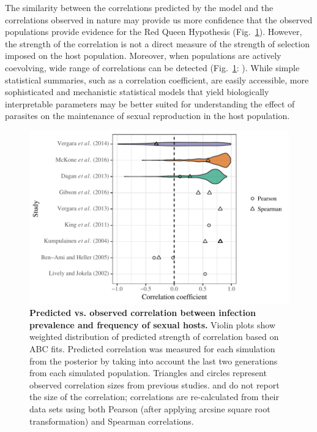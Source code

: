 \documentclass{article}\usepackage[]{graphicx}\usepackage[]{color}
\newcommand{\fref}[1]{Fig.~\ref{fig:#1}}
\begin{document}
The similarity between the correlations predicted by the model and the correlations observed in nature may provide us more confidence that the observed populations provide evidence for the Red Queen Hypothesis (\fref{effect}).
However, the strength of the correlation is not a direct measure of the strength of selection imposed on the host population.
Moreover, when populations are actively coevolving, wide range of correlations can be detected (\fref{effect}: \cite{vergara2014infection}).
While simple statistical summaries, such as a correlation coefficient, are easily accessible,
more sophisticated and mechanistic statistical models that yield biologically interpretable parameters may be better suited for understanding the effect of parasites on the maintenance of sexual reproduction in the host population.

\begin{figure}[!ht]
\includegraphics[width=\textwidth]{../fig/effect_size.pdf}
\caption{{\bf Predicted vs. observed correlation between infection prevalence and frequency of sexual hosts.}
Violin plots show weighted distribution of predicted strength of correlation based on ABC fits.
Predicted correlation was measured for each simulation from the posterior by taking into account the last two generations from each simulated population.
Triangles and circles represent observed correlation sizes from previous studies.
\cite{dagan2013clonal} and \cite{vergara2014infection} do not report the size of the correlation; correlations are re-calculated from their data sets using both Pearson (after applying arcsine square root transformation) and Spearman correlations.
}
\label{fig:effect}
\end{figure}
\end{document}
